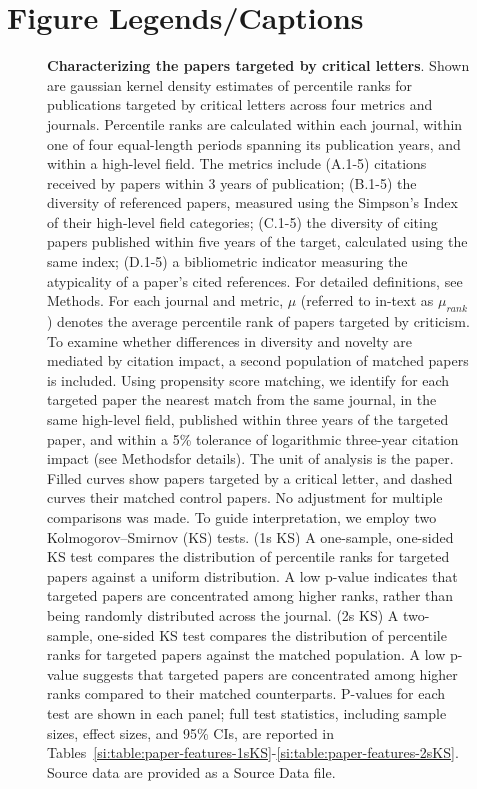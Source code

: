 \documentclass[12pt,a4paper]{article}
\numberwithin{equation}{section}
\def\methods{Methods}
\begin{document}
\section*{Figure Legends/Captions}
\begin{figure}
    \centering
    \caption{
    \textbf{Characterizing the papers targeted by critical letters}.
    Shown are gaussian kernel density estimates of percentile ranks for publications targeted by critical letters across four metrics and journals.
    Percentile ranks are calculated within each journal, within one of four equal-length periods spanning its publication years, and within a high-level field. 
    The metrics include (A.1-5) citations received by papers within 3 years of publication;
    (B.1-5)
    the diversity of referenced papers, measured using the Simpson's Index of their high-level field categories;
    (C.1-5)
    the diversity of citing papers published within five years of the target, calculated using the same index;
    (D.1-5)
    a bibliometric indicator measuring the atypicality of a paper’s cited references.
    For detailed definitions, see \methods. 
    For each journal and metric, $\mu$ (referred to in-text as $\mu_{rank}$) denotes the average percentile rank of papers targeted by criticism.
    To examine whether differences in diversity and novelty are mediated by citation impact, a second population of matched papers is included. 
    Using propensity score matching, we identify for each targeted paper the nearest match from the same journal, in the same high-level field, published within three years of the targeted paper, and within a 5\% tolerance of logarithmic three-year citation impact (see \methods for details).
    The unit of analysis is the paper. 
    Filled curves show papers targeted by a critical letter, and dashed curves their matched control papers.
    No adjustment for multiple comparisons was made.
    To guide interpretation, we employ two Kolmogorov–Smirnov (KS) tests.
    (1s KS) A one-sample, one-sided KS test compares the distribution of percentile ranks for targeted papers against a uniform distribution. A low p-value indicates that targeted papers are concentrated among higher ranks, rather than being randomly distributed across the journal.
    (2s KS) A two-sample, one-sided KS test compares the distribution of percentile ranks for targeted papers against the matched population. A low p-value suggests that targeted papers are concentrated among higher ranks compared to their matched counterparts.
    P-values for each test are shown in each panel; full test statistics, including sample sizes, effect sizes, and 95\% CIs, are reported in Tables~\ref*{si:table:paper-features-1sKS}-\ref*{si:table:paper-features-2sKS}.
    Source data are provided as a Source Data file.
    }
    \label{fig:paper-features}
\end{figure}
\end{document}
